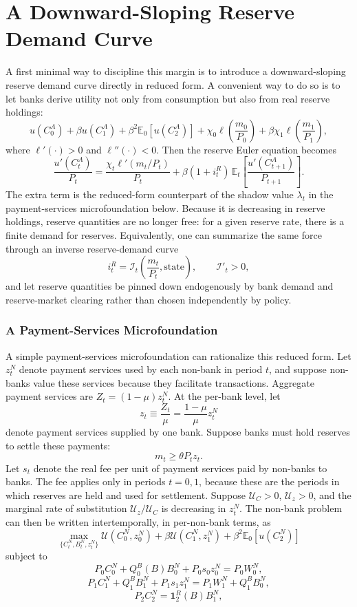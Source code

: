 \documentclass[12pt]{article}
\begin{document}
\section*{A Downward-Sloping Reserve Demand Curve}

A first minimal way to discipline this margin is to introduce a downward-sloping reserve demand curve directly in reduced form. A convenient way to do so is to let banks derive utility not only from consumption but also from real reserve holdings:
\[
u(C^A_0)+\beta u(C^A_1)+\beta^2\mathbb{E}_0[u(C^A_2)]
+ \chi_0 \ell\!\left(\frac{m_0}{P_0}\right)
+ \beta \chi_1 \ell\!\left(\frac{m_1}{P_1}\right),
\]
where $\ell'(\cdot)>0$ and $\ell''(\cdot)<0$. Then the reserve Euler equation becomes
\[
\frac{u'(C^A_t)}{P_t}
=
\frac{\chi_t \ell'\!\left(m_t/P_t\right)}{P_t}
+ \beta(1+i^R_t)\,\mathbb{E}_t\!\left[\frac{u'(C^A_{t+1})}{P_{t+1}}\right].
\]
The extra term is the reduced-form counterpart of the shadow value $\lambda_t$ in the payment-services microfoundation below. Because it is decreasing in reserve holdings, reserve quantities are no longer free: for a given reserve rate, there is a finite demand for reserves. Equivalently, one can summarize the same force through an inverse reserve-demand curve
\[
i^R_t = \mathcal{I}_t\!\left(\frac{m_t}{P_t},\text{state}\right),
\qquad
\mathcal{I}'_t>0,
\]
and let reserve quantities be pinned down endogenously by bank demand and reserve-market clearing rather than chosen independently by policy.


\subsubsection*{A Payment-Services Microfoundation}
A simple payment-services microfoundation can rationalize this reduced form. Let $z^N_t$ denote payment services used by each non-bank in period $t$, and suppose non-banks value these services because they facilitate transactions. Aggregate payment services are $Z_t=(1-\mu)z^N_t$. At the per-bank level, let
\[
z_t \equiv \frac{Z_t}{\mu} = \frac{1-\mu}{\mu} z^N_t
\]
denote payment services supplied by one bank. Suppose banks must hold reserves to settle these payments:
\[
m_t \ge \theta P_t z_t.
\]
Let $s_t$ denote the real fee per unit of payment services paid by non-banks to banks. The fee applies only in periods $t=0,1$, because these are the periods in which reserves are held and used for settlement. Suppose $\mathcal{U}_C>0$, $\mathcal{U}_z>0$, and the marginal rate of substitution $\mathcal{U}_z/\mathcal{U}_C$ is decreasing in $z^N_t$. The non-bank problem can then be written intertemporally, in per-non-bank terms, as
\[
\max_{\{C^N_t,B^N_t,z^N_t\}}
\mathcal{U}(C^N_0,z^N_0)
+\beta \mathcal{U}(C^N_1,z^N_1)
+\beta^2 \mathbb{E}_0[u(C^N_2)]
\]
subject to
\[
P_0 C^N_0 + Q^B_0(B)B^N_0 + P_0 s_0 z^N_0
=
P_0 W^N_0,
\]
\[
P_1 C^N_1 + Q^B_1 B^N_1 + P_1 s_1 z^N_1
=
P_1 W^N_1 + Q^B_1 B^N_0,
\]
\[
P_2 C^N_2
=
\mathbf{1}^{R}_2(B)B^N_1,
\]
\end{document}
